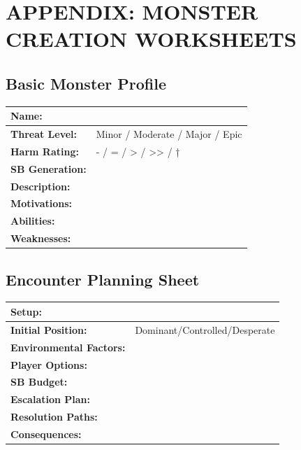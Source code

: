 \documentclass[12pt]{article}
\begin{document}

\section{APPENDIX: MONSTER CREATION WORKSHEETS}

\subsection*{Basic Monster Profile}

\begin{tabularx}{\textwidth}{|l|X|}
\hline
\textbf{Name:} & \\
\hline
\textbf{Threat Level:} & Minor / Moderate / Major / Epic \\
\hline
\textbf{Harm Rating:} & - / = / > / >> / † \\
\hline
\textbf{SB Generation:} & \\
\hline
\textbf{Description:} & \\
\hline
\textbf{Motivations:} & \\
\hline
\textbf{Abilities:} & \\
\hline
\textbf{Weaknesses:} & \\
\hline
\end{tabularx}

\subsection*{Encounter Planning Sheet}

\begin{tabularx}{\textwidth}{|l|X|}
\hline
\textbf{Setup:} & \\
\hline
\textbf{Initial Position:} & Dominant/Controlled/Desperate \\
\hline
\textbf{Environmental Factors:} & \\
\hline
\textbf{Player Options:} & \\
\hline
\textbf{SB Budget:} & \\
\hline
\textbf{Escalation Plan:} & \\
\hline
\textbf{Resolution Paths:} & \\
\hline
\textbf{Consequences:} & \\
\hline
\end{tabularx}
\end{document}
